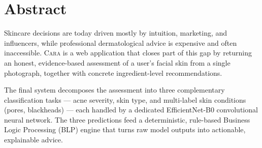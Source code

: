 \documentclass[11pt,a4paper,oneside]{report}
\newcommand{\cara}{\textsc{Cara}\xspace}
\newcommand{\effnet}{EfficientNet-B0\xspace}
\begin{document}
\chapter*{Abstract}

Skincare decisions are today driven mostly by intuition, marketing, and
influencers, while professional dermatological advice is expensive and
often inaccessible. \cara is a web application that closes part of this
gap by returning an honest, evidence-based assessment of a user's facial
skin from a single photograph, together with concrete ingredient-level
recommendations.

The final system decomposes the assessment into three complementary
classification tasks --- acne severity, skin type, and multi-label skin
conditions (pores, blackheads) --- each handled by a dedicated \effnet
convolutional neural network. The three predictions feed a
deterministic, rule-based Business Logic Processing (BLP) engine that
turns raw model outputs into actionable, explainable advice.
\end{document}
